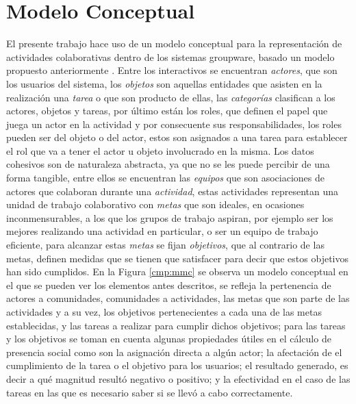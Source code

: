 \section{Modelo Conceptual}

El presente trabajo hace uso de un modelo conceptual para la representaci\'on de actividades colaborativas dentro de los sistemas groupware, basado un modelo propuesto anteriormente \cite{montane2013context}.  Entre los interactivos se encuentran \textit{actores}, que son los usuarios del sistema, los \textit{objetos} son aquellas entidades que asisten en la realizaci\'on una \textit{tarea} o que son producto de ellas, las \textit{categor\'ias} clasifican a los actores, objetos y tareas, por \'ultimo est\'an los roles, que definen el papel que juega un actor en la actividad y por consecuente sus responsabilidades, los roles pueden ser del objeto o del actor, estos son asignados a una tarea para establecer el rol que va a tener el actor u objeto involucrado en la misma. Los datos cohesivos son de naturaleza abstracta, ya que no se les puede percibir de una forma tangible, entre ellos se encuentran las \textit{equipos} que son asociaciones de actores que colaboran durante una \textit{actividad}, estas actividades representan una unidad de trabajo colaborativo con \textit{metas} que son ideales, en ocasiones inconmensurables, a los que los grupos de trabajo aspiran, por ejemplo ser los mejores realizando una actividad en particular, o ser un equipo de trabajo eficiente, para alcanzar estas \textit{metas} se fijan \textit{objetivos}, que al contrario de las metas, definen medidas que se tienen que satisfacer para decir que estos objetivos han sido cumplidos. En la Figura \ref{cmp:mmc} se observa un modelo conceptual en el que se pueden ver los elementos antes descritos, se refleja la pertenencia de actores a comunidades, comunidades a actividades, las metas que son parte de las actividades y a su vez, los objetivos pertenecientes a cada una de las metas establecidas, y las tareas a realizar para cumplir dichos objetivos; para las tareas y los objetivos se toman en cuenta algunas propiedades \'utiles en el c\'alculo de presencia social como son la asignaci\'on directa a alg\'un actor; la afectaci\'on	de el cumplimiento de la tarea o el objetivo para los usuarios; el resultado generado, es decir a qu\'e magnitud result\'o negativo o positivo; y la efectividad en el caso de las tareas en las que es necesario saber si se llev\'o a cabo correctamente\cite{addCiteHere}.

